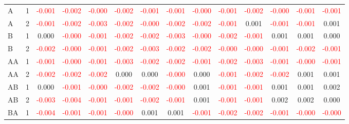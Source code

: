 \begin{table}[!htb]
{\begin{tabular}{llcccccccccccc}
A & 1 & \textcolor{red}{-0.001} & \textcolor{red}{-0.002} & \textcolor{red}{-0.000} & \textcolor{red}{-0.002} & \textcolor{red}{-0.001} & \textcolor{red}{-0.001} & \textcolor{red}{-0.000} & \textcolor{red}{-0.001} & \textcolor{red}{-0.002} & \textcolor{red}{-0.000} & \textcolor{red}{-0.001} & \textcolor{red}{-0.001}\\
A & 2 & \textcolor{red}{-0.001} & \textcolor{red}{-0.002} & \textcolor{red}{-0.003} & \textcolor{red}{-0.002} & \textcolor{red}{-0.000} & \textcolor{red}{-0.002} & \textcolor{red}{-0.002} & \textcolor{red}{-0.001} & 0.001 & \textcolor{red}{-0.001} & \textcolor{red}{-0.001} & 0.001\\
B & 1 & 0.000 & \textcolor{red}{-0.000} & \textcolor{red}{-0.001} & \textcolor{red}{-0.002} & \textcolor{red}{-0.002} & \textcolor{red}{-0.003} & \textcolor{red}{-0.000} & \textcolor{red}{-0.002} & \textcolor{red}{-0.001} & 0.001 & 0.001 & 0.000\\
B & 2 & \textcolor{red}{-0.002} & \textcolor{red}{-0.000} & \textcolor{red}{-0.001} & \textcolor{red}{-0.002} & \textcolor{red}{-0.003} & \textcolor{red}{-0.002} & \textcolor{red}{-0.002} & \textcolor{red}{-0.000} & \textcolor{red}{-0.000} & \textcolor{red}{-0.001} & \textcolor{red}{-0.002} & \textcolor{red}{-0.001}\\
AA & 1 & \textcolor{red}{-0.001} & \textcolor{red}{-0.000} & \textcolor{red}{-0.001} & \textcolor{red}{-0.003} & \textcolor{red}{-0.002} & \textcolor{red}{-0.002} & \textcolor{red}{-0.001} & \textcolor{red}{-0.002} & \textcolor{red}{-0.003} & \textcolor{red}{-0.001} & \textcolor{red}{-0.000} & \textcolor{red}{-0.001}\\
AA & 2 & \textcolor{red}{-0.002} & \textcolor{red}{-0.002} & \textcolor{red}{-0.002} & 0.000 & 0.000 & \textcolor{red}{-0.000} & 0.000 & \textcolor{red}{-0.001} & \textcolor{red}{-0.002} & \textcolor{red}{-0.002} & 0.001 & 0.001\\
AB & 1 & 0.000 & \textcolor{red}{-0.001} & \textcolor{red}{-0.000} & \textcolor{red}{-0.002} & \textcolor{red}{-0.002} & \textcolor{red}{-0.000} & 0.001 & \textcolor{red}{-0.001} & \textcolor{red}{-0.001} & 0.001 & 0.001 & 0.002\\
AB & 2 & \textcolor{red}{-0.003} & \textcolor{red}{-0.004} & \textcolor{red}{-0.001} & \textcolor{red}{-0.001} & \textcolor{red}{-0.002} & \textcolor{red}{-0.001} & 0.001 & \textcolor{red}{-0.001} & \textcolor{red}{-0.001} & 0.002 & 0.002 & 0.000\\
BA & 1 & \textcolor{red}{-0.004} & \textcolor{red}{-0.001} & \textcolor{red}{-0.001} & \textcolor{red}{-0.000} & 0.001 & 0.001 & \textcolor{red}{-0.001} & \textcolor{red}{-0.002} & \textcolor{red}{-0.002} & \textcolor{red}{-0.001} & \textcolor{red}{-0.000} & \textcolor{red}{-0.000}\\

\end{tabular}}
\end{table}
